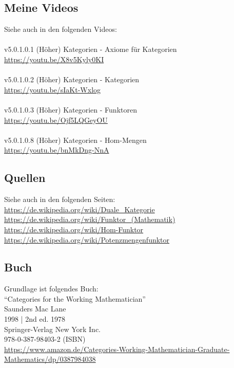 \documentclass[a4paper]{amsart}
\theoremstyle{definition}
\begin{document}
\subsection*{Meine Videos}
Siehe auch in den folgenden Videos:\\
\\
v5.0.1.0.1 (Höher) Kategorien - Axiome für Kategorien\\
\url{https://youtu.be/X8v5Kyly0KI}\\
\\
v5.0.1.0.2 (Höher) Kategorien - Kategorien\\
\url{https://youtu.be/sIaKt-Wxlog}\\
\\
v5.0.1.0.3 (Höher) Kategorien - Funktoren\\
\url{https://youtu.be/Ojf5LQGeyOU}\\
\\
v5.0.1.0.8 (Höher) Kategorien - Hom-Mengen\\
\url{https://youtu.be/bnMkDng-NnA}

\subsection*{Quellen}
Siehe auch in den folgenden Seiten:\\
\url{https://de.wikipedia.org/wiki/Duale_Kategorie}\\
\url{https://de.wikipedia.org/wiki/Funktor_(Mathematik)}\\
\url{https://de.wikipedia.org/wiki/Hom-Funktor}\\
\url{https://de.wikipedia.org/wiki/Potenzmengenfunktor}

\subsection*{Buch}
Grundlage ist folgendes Buch:\\
"`Categories for the Working Mathematician"'\\
Saunders Mac Lane\\
1998 | 2nd ed. 1978\\
Springer-Verlag New York Inc.\\
978-0-387-98403-2 (ISBN)\\
{\tiny
   \url{https://www.amazon.de/Categories-Working-Mathematician-Graduate-Mathematics/dp/0387984038}}\\
\end{document}
